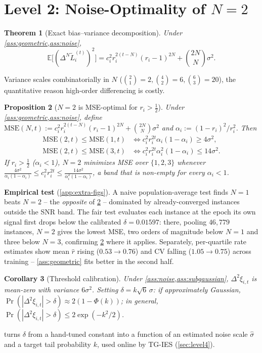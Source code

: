 \documentclass{article}
\theoremstyle{plain}
\newtheorem{theorem}{Theorem}[section]
\newtheorem{proposition}[theorem]{Proposition}
\newtheorem{corollary}[theorem]{Corollary}
\theoremstyle{definition}
\theoremstyle{remark}
\begin{document}
\section{Level 2: Noise-Optimality of $N=2$}
\label{sec:level2}

\begin{theorem}[Exact bias--variance decomposition]
\label{thm:bv}
Under \cref{ass:geometric,ass:noise},
\begin{equation}
\label{eq:bv}
\mathbb E\big[(\Delta^N \tilde L_i^{(t)})^2\big] = c_i^2 r_i^{2(t-N)}(r_i-1)^{2N} + \binom{2N}{N}\sigma^2.
\end{equation}
\end{theorem}
Variance scales combinatorially in $N$ ($\binom21{=}2,\binom42{=}6,\binom63{=}20$), the quantitative reason high-order differencing is costly.

\begin{proposition}[$N=2$ is MSE-optimal for $r_i>\tfrac12$]
\label{prop:mse}
Under \cref{ass:geometric,ass:noise}, define $\mathrm{MSE}(N,t) := c_i^2 r_i^{2(t-N)}(r_i-1)^{2N} + \binom{2N}{N}\sigma^2$ and $\alpha_i := (1-r_i)^2/r_i^2$. Then
\begin{align}
\mathrm{MSE}(2,t)\!\le\!\mathrm{MSE}(1,t) &\iff c_i^2 r_i^{2t}\alpha_i(1-\alpha_i) \ge 4\sigma^2, \label{eq:mse12}\\
\mathrm{MSE}(2,t)\!\le\!\mathrm{MSE}(3,t) &\iff c_i^2 r_i^{2t}\alpha_i^2(1-\alpha_i) \le 14\sigma^2. \label{eq:mse23}
\end{align}
If $r_i>\tfrac12$ ($\alpha_i<1$), $N=2$ minimizes MSE over $\{1,2,3\}$ whenever $\tfrac{4\sigma^2}{\alpha_i(1-\alpha_i)} \le c_i^2 r_i^{2t} \le \tfrac{14\sigma^2}{\alpha_i^2(1-\alpha_i)}$, a band that is non-empty for every $\alpha_i<1$.
\end{proposition}
\textbf{Empirical test} (\cref{app:extra-figs}). A naive population-average test finds $N{=}1$ beats $N{=}2$ -- the \emph{opposite} of \cref{prop:mse} -- dominated by already-converged instances outside the SNR band. The fair test evaluates each instance at the epoch its own signal first drops below the calibrated $\delta{=}0.01597$: there, pooling $46{,}779$ instances, $N{=}2$ gives the lowest MSE, two orders of magnitude below $N{=}1$ and three below $N{=}3$, confirming \cref{prop:mse} where it applies. Separately, per-quartile rate estimates show mean $\hat r$ rising ($0.53\to0.76$) and CV falling ($1.05\to0.75$) across training -- \cref{ass:geometric} fits better in the second half.

\begin{corollary}[Threshold calibration]
\label{cor:threshold}
Under \cref{ass:noise,ass:subgaussian}, $\Delta^2\xi_{i,t}$ is mean-zero with variance $6\sigma^2$. Setting $\delta = k\sqrt6\,\sigma$: if approximately Gaussian, $\Pr(|\Delta^2\xi_{i,t}|>\delta)\approx 2(1-\Phi(k))$; in general, $\Pr(|\Delta^2\xi_{i,t}|>\delta) \le 2\exp(-k^2/2)$.
\end{corollary}
 turns $\delta$ from a hand-tuned constant into a function of an estimated noise scale $\hat\sigma$ and a target tail probability $k$, used online by TG-IES (\cref{sec:level4}).
\end{document}
